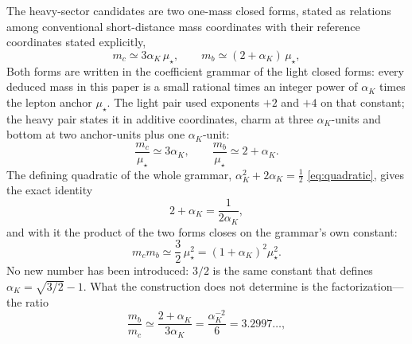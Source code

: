 \documentclass[aps,twocolumn,superscriptaddress,nofootinbib,floatfix]{revtex4-2}
\newcommand{\mstar}{\mu_\star}
\newcommand{\alphaK}{\alpha_K}
\begin{document}
The heavy-sector candidates are two one-mass closed forms, stated as relations among conventional short-distance mass coordinates with their reference coordinates stated explicitly,
\begin{equation}
\boxed{m_c\simeq 3\alphaK\,\mstar,
\qquad
m_b\simeq(2+\alphaK)\,\mstar,}
\label{eq:heavymirror}
\end{equation}
Both forms are written in the coefficient grammar of the light closed forms: every deduced mass in this paper is a small rational times an integer power of $\alphaK$ times the lepton anchor $\mstar$. The light pair used exponents $+2$ and $+4$ on that constant; the heavy pair states it in additive coordinates, charm at three $\alphaK$-units and bottom at two anchor-units plus one $\alphaK$-unit:
\begin{equation}
\frac{m_c}{\mstar}\simeq 3\alphaK,\qquad \frac{m_b}{\mstar}\simeq 2+\alphaK.
\label{eq:sharedgrammar}
\end{equation}
The defining quadratic of the whole grammar, $\alphaK^2+2\alphaK=\tfrac12$ \eqref{eq:quadratic}, gives the exact identity
\begin{equation}
2+\alphaK=\frac{1}{2\alphaK},
\label{eq:heavyidentity}
\end{equation}
and with it the product of the two forms closes on the grammar's own constant:
\begin{equation}
m_cm_b\simeq\frac32\,\mstar^2=(1+\alphaK)^2\mstar^2.
\label{eq:heavyproduct}
\end{equation}
No new number has been introduced: $3/2$ is the same constant that defines $\alphaK=\sqrt{3/2}-1$. What the construction does not determine is the factorization---the ratio
\begin{equation}
\frac{m_b}{m_c}\simeq\frac{2+\alphaK}{3\alphaK}=\frac{\alpha_K^{-2}}{6}=3.2997\ldots,
\label{eq:ratioheavy}
\end{equation}
\end{document}
